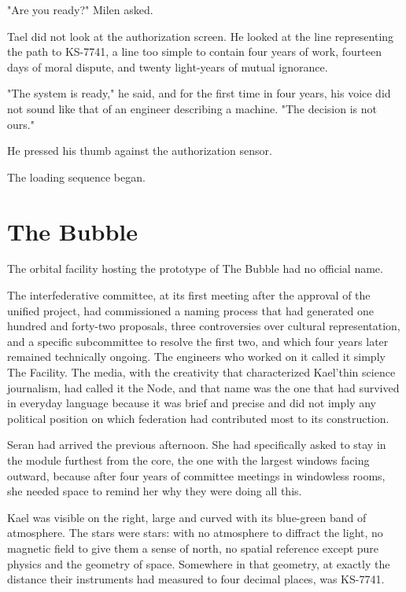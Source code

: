 \documentclass[11pt,a5paper,twoside]{book}
\begin{document}
"Are you ready?" Milen asked.

Tael did not look at the authorization screen. He looked at the line representing the path to KS-7741, a line too simple to contain four years of work, fourteen days of moral dispute, and twenty light-years of mutual ignorance.

"The system is ready," he said, and for the first time in four years, his voice did not sound like that of an engineer describing a machine. "The decision is not ours."

He pressed his thumb against the authorization sensor.

The loading sequence began.

\chapter{The Bubble}

The orbital facility hosting the prototype of The Bubble had no official name.

The interfederative committee, at its first meeting after the approval of the unified project, had commissioned a naming process that had generated one hundred and forty-two proposals, three controversies over cultural representation, and a specific subcommittee to resolve the first two, and which four years later remained technically ongoing. The engineers who worked on it called it simply The Facility. The media, with the creativity that characterized Kael'thin science journalism, had called it the Node, and that name was the one that had survived in everyday language because it was brief and precise and did not imply any political position on which federation had contributed most to its construction.

Seran had arrived the previous afternoon. She had specifically asked to stay in the module furthest from the core, the one with the largest windows facing outward, because after four years of committee meetings in windowless rooms, she needed space to remind her why they were doing all this.

Kael was visible on the right, large and curved with its blue-green band of atmosphere. The stars were stars: with no atmosphere to diffract the light, no magnetic field to give them a sense of north, no spatial reference except pure physics and the geometry of space. Somewhere in that geometry, at exactly the distance their instruments had measured to four decimal places, was KS-7741.
\end{document}
